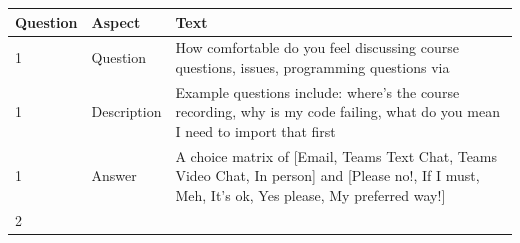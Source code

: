 \documentclass[paper=a4,justified,a4paper]{tufte-handout}
\begin{document}
\begin{longtable}[]{@{}lll@{}}
\toprule
\begin{minipage}[b]{0.30\columnwidth}\raggedright
Question\strut
\end{minipage} & \begin{minipage}[b]{0.30\columnwidth}\raggedright
Aspect\strut
\end{minipage} & \begin{minipage}[b]{0.30\columnwidth}\raggedright
Text\strut
\end{minipage}\tabularnewline
\midrule
\endhead
\begin{minipage}[t]{0.30\columnwidth}\raggedright
1\strut
\end{minipage} & \begin{minipage}[t]{0.30\columnwidth}\raggedright
Question\strut
\end{minipage} & \begin{minipage}[t]{0.30\columnwidth}\raggedright
How comfortable do you feel discussing course questions, issues,
programming questions via\strut
\end{minipage}\tabularnewline
\begin{minipage}[t]{0.30\columnwidth}\raggedright
1\strut
\end{minipage} & \begin{minipage}[t]{0.30\columnwidth}\raggedright
Description\strut
\end{minipage} & \begin{minipage}[t]{0.30\columnwidth}\raggedright
Example questions include: where's the course recording, why is my code
failing, what do you mean I need to import that first\strut
\end{minipage}\tabularnewline
\begin{minipage}[t]{0.30\columnwidth}\raggedright
1\strut
\end{minipage} & \begin{minipage}[t]{0.30\columnwidth}\raggedright
Answer\strut
\end{minipage} & \begin{minipage}[t]{0.30\columnwidth}\raggedright
A choice matrix of {[}Email, Teams Text Chat, Teams Video Chat, In
person{]} and {[}Please no!, If I must, Meh, It's ok, Yes please, My
preferred way!{]}\strut
\end{minipage}\tabularnewline
\begin{minipage}[t]{0.30\columnwidth}\raggedright
2\strut
\end{minipage} & \begin{minipage}[t]{0.30\columnwidth}\raggedright

\end{minipage}
\end{longtable}
\end{document}
